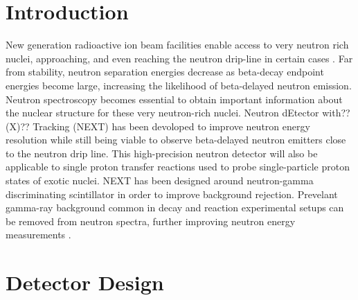 \documentclass[preprint,3p,twocolumn]{elsarticle}
\begin{document}
\linenumbers

\section{Introduction}
New generation radioactive ion beam facilities enable access to very neutron rich nuclei, approaching, and even reaching the neutron drip-line in certain
cases \cite{FRIB}.
Far from stability, neutron separation energies decrease as beta-decay endpoint energies become large, increasing the likelihood of beta-delayed neutron emission. Neutron spectroscopy becomes essential to obtain important information about the nuclear structure for these very neutron-rich nuclei. 
Neutron dEtector with??(X)?? Tracking (NEXT) has been devoloped to improve neutron energy resolution while still being viable to observe beta-delayed neutron emitters close to the neutron drip line. 
This high-precision neutron detector will also be applicable to single proton transfer reactions used to probe single-particle proton states of exotic nuclei. NEXT has been designed around neutron-gamma discriminating scintillator in order to improve background rejection. Prevelant gamma-ray background common in decay and reaction experimental setups can be removed from neutron spectra, further improving neutron energy measurements \cite{FEBBRARO2018189}.

\section{ Detector Design}
\end{document}
